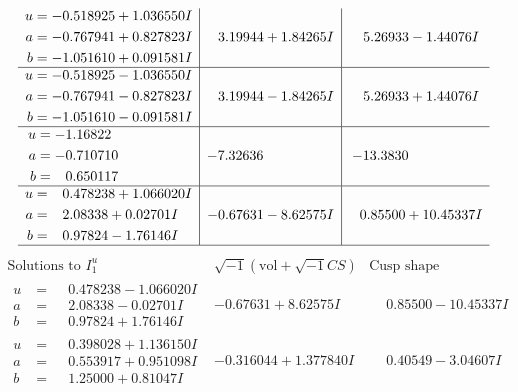 \documentclass[1p]{elsarticle_modified}
\theoremstyle{definition}
\newcommand{\I}{\sqrt{-1}}
\begin{document}
$$\begin{array}{c|c|c}
\begin{aligned}
u &= -0.518925 + 1.036550 I \\
a &= -0.767941 + 0.827823 I \\
b &= -1.051610 + 0.091581 I\end{aligned}
 & \phantom{-}3.19944 + 1.84265 I & \phantom{-}5.26933 - 1.44076 I \\ \hline\begin{aligned}
u &= -0.518925 - 1.036550 I \\
a &= -0.767941 - 0.827823 I \\
b &= -1.051610 - 0.091581 I\end{aligned}
 & \phantom{-}3.19944 - 1.84265 I & \phantom{-}5.26933 + 1.44076 I \\ \hline\begin{aligned}
u &= -1.16822\phantom{ +0.000000I} \\
a &= -0.710710\phantom{ +0.000000I} \\
b &= \phantom{-}0.650117\phantom{ +0.000000I}\end{aligned}
 & -7.32636\phantom{ +0.000000I} & -13.3830\phantom{ +0.000000I} \\ \hline\begin{aligned}
u &= \phantom{-}0.478238 + 1.066020 I \\
a &= \phantom{-}2.08338 + 0.02701 I \\
b &= \phantom{-}0.97824 - 1.76146 I\end{aligned}
 & -0.67631 - 8.62575 I & \phantom{-}0.85500 + 10.45337 I\\
 \hline 
 \end{array}$$\newpage$$\begin{array}{c|c|c}  
\text{Solutions to }I^u_{1}& \I (\text{vol} + \sqrt{-1}CS) & \text{Cusp shape}\\
 \hline 
\begin{aligned}
u &= \phantom{-}0.478238 - 1.066020 I \\
a &= \phantom{-}2.08338 - 0.02701 I \\
b &= \phantom{-}0.97824 + 1.76146 I\end{aligned}
 & -0.67631 + 8.62575 I & \phantom{-}0.85500 - 10.45337 I \\ \hline\begin{aligned}
u &= \phantom{-}0.398028 + 1.136150 I \\
a &= \phantom{-}0.553917 + 0.951098 I \\
b &= \phantom{-}1.25000 + 0.81047 I\end{aligned}
 & -0.316044 + 1.377840 I & \phantom{-}0.40549 - 3.04607 I \\ \hline\begin{aligned}

\end{aligned}
\end{array}$$
\end{document}
